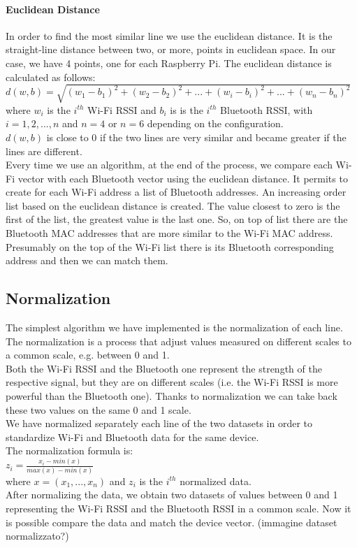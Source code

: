 \paragraph{Euclidean Distance}
In order to find the most similar line we use the euclidean distance. It is the straight-line distance between two, or more, points in euclidean space. In our case, we have 4 points, one for each Raspberry Pi. The euclidean distance is calculated as follows:\\
\(d(w,b) = \sqrt{(w_1 - b_1)^2 + (w_2 - b_2)^2 +... + (w_i - b_i)^2 + ... + (w_n - b_n)^2}\)
where \(w_i\) is the \(i^{th}\) Wi-Fi RSSI and \(b_i\) is  is the \(i^{th}\) Bluetooth RSSI, with \(i = 1, 2, ..., n\) and \(n = 4\) or \( n = 6 \) depending on the configuration.\\
\(d(w,b)\) is close to 0 if the two lines are very similar and became greater if the lines are different.\\
\linebreak
Every time we use an algorithm, at the end of the process, we compare each Wi-Fi vector with each Bluetooth vector using the euclidean distance. It permits to create for each Wi-Fi address a list of Bluetooth addresses. An increasing order list based on the euclidean distance is created. The value closest to zero is the first of the list, the greatest value is the last one. So, on top of list there are the Bluetooth MAC addresses that are more similar to the Wi-Fi MAC address. Presumably on the top of the Wi-Fi list there is its Bluetooth corresponding address and then we can match them.

\subsection{Normalization}
The simplest algorithm we have implemented is the normalization of each line.\\
The normalization is a process that adjust values measured on different scales to a common scale, e.g. between 0 and 1.\\
Both the Wi-Fi RSSI and the Bluetooth one represent the strength of the respective signal, but they are on different scales (i.e. the Wi-Fi RSSI is more powerful than the Bluetooth one). Thanks to normalization we can take back these two values on the same 0 and 1 scale.\\
\linebreak
We have normalized separately each line of the two datasets in order to standardize Wi-Fi and Bluetooth data for the same device.\\
The normalization formula is:\\
\( z_i = \frac{x_i-min(x)}{max(x)-min(x)} \)\\
where \( x=(x_1,..., x_n)\) and \(z_i\) is the \(i^{th}\) normalized data.\\
\linebreak
After normalizing the data, we obtain two datasets of values between 0 and 1 representing the Wi-Fi RSSI and the Bluetooth RSSI in a common scale. Now it is possible compare the data and match the device vector.
(immagine dataset normalizzato?)

